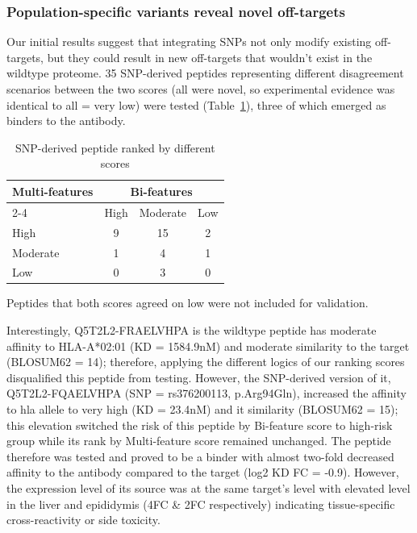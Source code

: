 \documentclass[unnumsec,webpdf,contemporary,large]{oup-authoring-template}%
\theoremstyle{thmstyleone}%
\theoremstyle{thmstyletwo}%
\theoremstyle{thmstylethree}%
\begin{document}
        \subsubsection{\textbf{Population-specific variants reveal novel off-targets}}
            Our initial results suggest that integrating SNPs not only modify existing off-targets, but they could result in new off-targets that wouldn’t exist in the wildtype proteome. 
            35 SNP-derived peptides representing different disagreement scenarios between the two scores (all were novel, so experimental evidence was identical to all = very low) were tested (Table~\ref{tab:snp_validated}), three of which emerged as binders to the antibody.
            \begin{table}[!htbp]
                \caption{SNP-derived peptide ranked by different scores\label{tab:snp_validated}}%
                \centering
                \begin{tabular*}{\columnwidth}{@{\extracolsep\fill}lccc@{\extracolsep\fill}}
                    \toprule
                    \multicolumn{1}{c}{\multirow{2}{*}{\textbf{Multi-features}}} & 
                    \multicolumn{3}{c}{\textbf{Bi-features}} \\
                    \cmidrule(lr){2-4}
                        & High & Moderate & Low \\
                    \midrule
                    High & 9 & 15 & 2 \\
                    Moderate & 1 & 4 & 1 \\
                    Low & 0 & 3 & 0 \\
                    \bottomrule
                \end{tabular*}
                \begin{tablenotes}%
                    \item Peptides that both scores agreed on low were not included for validation.
                \end{tablenotes}
            \end{table}
            Interestingly, Q5T2L2-FRAELVHPA is the wildtype peptide has moderate affinity to HLA-A*02:01 (KD = 1584.9nM) and moderate similarity to the target (BLOSUM62 = 14); therefore, applying the different logics of our ranking scores disqualified this peptide from testing. However, the SNP-derived version of it, Q5T2L2-FQAELVHPA (SNP = rs376200113, p.Arg94Gln), increased the affinity to hla allele to very high (KD = 23.4nM) and it similarity (BLOSUM62 = 15); this elevation switched the risk of this peptide by Bi-feature score to high-risk group while its rank by Multi-feature score remained unchanged. The peptide therefore was tested and proved to be a binder with almost two-fold decreased affinity to the antibody compared to the target (log2 KD FC = -0.9). However, the expression level of its source was at the same target’s level with elevated level in the liver and epididymis (4FC \& 2FC respectively) indicating tissue-specific cross-reactivity or side toxicity.
            
\end{document}
